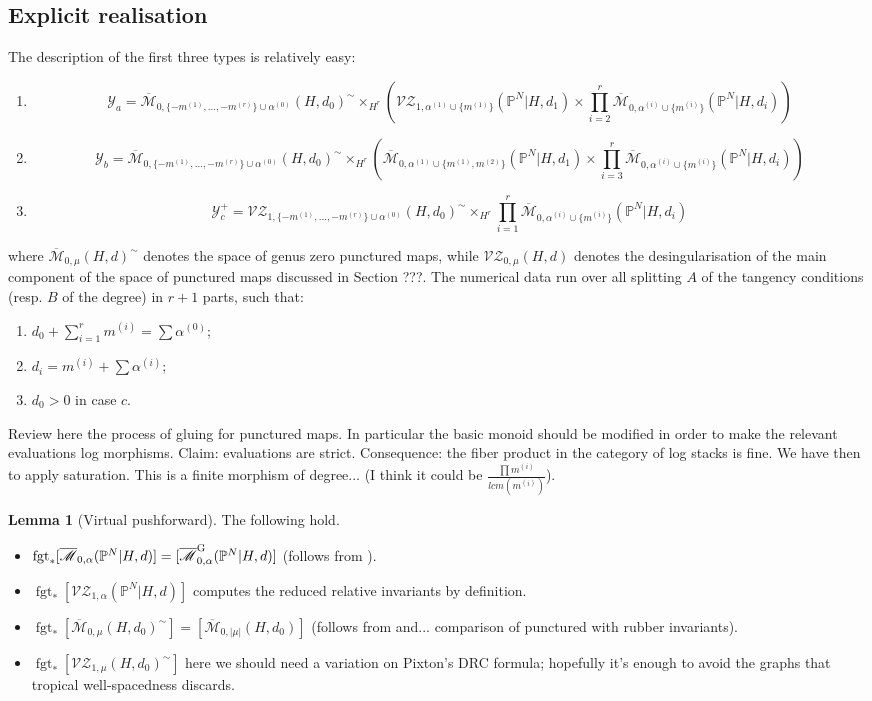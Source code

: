 \documentclass[11pt]{amsart}
\newcommand{\M}[4]{\overline{\mathcal{M}}_{#1,#2}(#3,#4)}
\newcommand{\MG}[4]{\overline{\mathcal{M}}^{\rm G}_{#1,#2}(#3,#4)}
\newcommand{\PP}{\mathbb P}
\newcommand{\VZc}[4]{\mathcal{V\!Z}_{#1,#2}(#3,#4)}
\newcommand{\fgt}{\operatorname{fgt}}
\theoremstyle{definition}
\newtheorem{lemma}[thm]{Lemma}
\theoremstyle{definition}
\begin{document}
\subsection{Explicit realisation}
The description of the first three types is relatively easy:
\begin{enumerate}[label=(\alph*)]
 \item \[\mathcal Y_a=\M{0}{\{-m^{(1)},\ldots,-m^{(r)}\}\cup\alpha^{(0)}}{H}{d_0}^\sim\times_{H^r}\left(\VZc{1}{\alpha^{(1)}\cup\{m^{(1)}\}}{\PP^N|H}{d_1}\times\prod_{i=2}^r\M{0}{\alpha^{(i)}\cup\{m^{(i)}\}}{\PP^N|H}{d_i}\right)\]
 \item \[\mathcal Y_b=\M{0}{\{-m^{(1)},\ldots,-m^{(r)}\}\cup\alpha^{(0)}}{H}{d_0}^\sim\times_{H^r}\left(\M{0}{\alpha^{(1)}\cup\{m^{(1)},m^{(2)}\}}{\PP^N|H}{d_1}\times\prod_{i=3}^r\M{0}{\alpha^{(i)}\cup\{m^{(i)}\}}{\PP^N|H}{d_i}\right)\]
 \item \[\mathcal Y_c^+= \VZc{1}{\{-m^{(1)},\ldots,-m^{(r)}\}\cup\alpha^{(0)}}{H}{d_0}^{\sim} \times_{H^r}\prod_{i=1}^r\M{0}{\alpha^{(i)}\cup\{m^{(i)}\}}{\PP^N|H}{d_i}\]
\end{enumerate}
where $\M{0}{\mu}{H}{d}^\sim$ denotes the space of genus zero punctured maps, while $\VZc{0}{\mu}{H}{d}$ denotes the desingularisation of the main component of the space of punctured maps discussed in Section ???. The numerical data run over all splitting $A$ of the tangency conditions (resp. $B$ of the degree) in $r+1$ parts, such that:
\begin{enumerate}
 \item $d_0+\sum_{i=1}^r m^{(i)}=\sum\alpha^{(0)}$;
 \item $d_i=m^{(i)}+\sum\alpha^{(i)}$;
 \item $d_0>0$ in case $c$.
\end{enumerate}

Review here the process of gluing for punctured maps. In particular the basic monoid should be modified in order to make the relevant evaluations log morphisms. Claim: evaluations are strict. Consequence: the fiber product in the category of log stacks is fine. We have then to apply saturation. This is a finite morphism of degree... (I think it could be $\frac{\prod m^{(i)}}{lcm(m^{(i)})}$).

\begin{lemma}[Virtual pushforward] The following hold.
 \begin{itemize}
  \item $\fgt_*[\M{0}{\alpha}{\PP^N|H}{d}]=[\MG{0}{\alpha}{\PP^N|H}{d}]$ (follows from \cite{GathmannThesis,AbramovichMarcusWiseComparison}).
  \item $\fgt_*[\VZc{1}{\alpha}{\PP^N|H}{d}]$ computes the reduced relative invariants by definition.
  \item $\fgt_*[\M{0}{\mu}{H}{d_0}^\sim]=[\M{0}{\lvert\mu\rvert}{H}{d_0}]$ (follows from \cite{GathmannThesis} and... comparison of punctured with rubber invariants).
  \item $\fgt_*[\VZc{1}{\mu}{H}{d_0}^\sim]$ here we should need a variation on Pixton's DRC formula; hopefully it's enough to avoid the graphs that tropical well-spacedness discards.
 \end{itemize}
\end{lemma}
\end{document}

